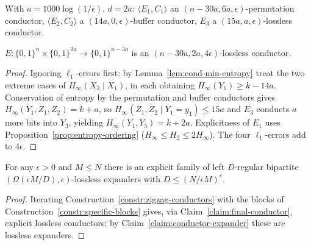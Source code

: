 \begin{construction}
  \label{constr:specific-blocks}
  With $a=1000\log(1/\epsilon)$, $d=2a$: $\langle E_1,C_1\rangle$ an
  $(n-30a,6a,\epsilon)$-permutation conductor, $\langle E_2,C_2\rangle$ a
  $(14a,0,\epsilon)$-buffer conductor, $E_3$ a $(15a,a,\epsilon)$-lossless
  conductor.
\end{construction}

\begin{claim}
  \label{claim:final-conductor}
  $E:\{0,1\}^n\times\{0,1\}^{2a}\to\{0,1\}^{n-3a}$ is an
  $(n-30a,2a,4\epsilon)$-lossless conductor.
\end{claim}
\begin{proof}
  Ignoring $\ell_1$-errors first: by Lemma~\ref{lem:cond-min-entropy} treat the
  two extreme cases of $H_\infty(X_2\mid X_1)$, in each obtaining
  $H_\infty(Y_1)\ge k-14a$. Conservation of entropy by the permutation and buffer
  conductors gives $H_\infty(Y_1,Z_1,Z_2)=k+a$, so $H_\infty(Z_1,Z_2\mid
  Y_1=y_1)\le15a$ and $E_3$ conducts $a$ more bits into $Y_3$, yielding
  $H_\infty(Y_1,Y_3)=k+2a$. Explicitness of $E_1$ uses
  Proposition~\ref{prop:entropy-ordering} ($H_\infty\le H_2\le2H_\infty$). The
  four $\ell_1$-errors add to $4\epsilon$.
\end{proof}

\begin{theorem}
  \label{thm:lossless-existence}
  For any $\epsilon>0$ and $M\le N$ there is an explicit family of left
  $D$-regular bipartite $(\Omega(\epsilon M/D),\epsilon)$-lossless expanders with
  $D\le(N/\epsilon M)^c$.
\end{theorem}
\begin{proof}
  Iterating Construction~\ref{constr:zigzag-conductors} with the blocks of
  Construction~\ref{constr:specific-blocks} gives, via
  Claim~\ref{claim:final-conductor}, explicit lossless conductors; by
  Claim~\ref{claim:conductor-expander} these are lossless expanders.
\end{proof}

